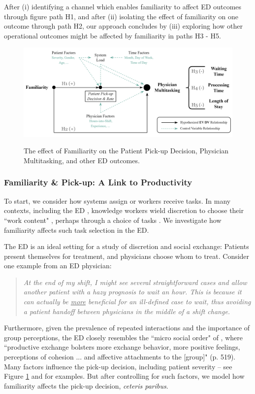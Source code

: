  After (i) identifying a channel which enables familiarity to affect ED outcomes through figure path H1, and after (ii) isolating the effect of familiarity on one outcome through path H2, our approach concludes by (iii) exploring how other operational outcomes might be affected by familiarity in paths H3 - H5.
 
 \begin{figure}[htbp]
     \centering
     \caption{The effect of Familiarity on the Patient Pick-up Decision, Physician Multitasking, and other ED outcomes.} \medskip
     \includegraphics[scale=.8]{Figures/PU/Path Diagram.png}     
     \label{fig:path}
 \end{figure}
 
 \subsubsection{Familiarity \& Pick-up: A Link to Productivity}
 To start, we consider how systems assign or workers receive tasks. In many contexts, including the ED \citep[see][]{Chan2016}, knowledge workers wield discretion to choose their “work content" \citep[p. 340]{Allon2019}, perhaps through a choice of tasks \citep[e.g.,][]{VanDonselaar2010,KC2020_productivity,Ibanez2017}. We investigate how familiarity affects such task selection in the ED. 
 
 The ED is an ideal setting for a study of discretion and social exchange: Patients present themselves for treatment, and physicians choose whom to treat. Consider one example from an ED physician: 
 \begin{quote} \textit{At the end of my shift, I might see several straightforward cases and allow another patient with a hazy prognosis to wait an hour. This is because it can actually be \underline{more} beneficial for an ill-defined case to wait, thus avoiding a patient handoff between physicians in the middle of a shift change.} \end{quote} 
 Furthermore, given the prevalence of repeated interactions and the importance of group perceptions, the ED closely resembles the “micro social order" of \cite{Lawler2008}, where “productive exchange bolsters more exchange behavior, more positive feelings, perceptions of cohesion ... and affective attachments to the [group]" (p. 519). Many factors influence the pick-up decision, including patient severity -- see Figure \ref{fig:path} and \cite{Patterson2016} for examples. But after controlling for such factors, we model how familiarity affects the pick-up decision, \textit{ceteris paribus}.
 
